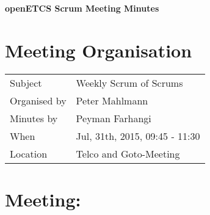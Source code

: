 \documentclass[a4paper, 11pt]{article}
\begin{document}
{\begin{center}\huge\bf openETCS Scrum Meeting Minutes\end{center}}
\section{Meeting Organisation}

\renewcommand{\arraystretch}{1.5}
\begin{supertabular}{m{.2\textwidth}m{.8\textwidth}}
Subject & Weekly Scrum of Scrums\\
Organised by &Peter Mahlmann\\
Minutes by & Peyman Farhangi\\
When & Jul, 31th, 2015, 09:45 - 11:30\\
Location & Telco and Goto-Meeting\\
\end{supertabular}

\renewcommand{\arraystretch}{1.0}
\section{Meeting:}
\end{document}
